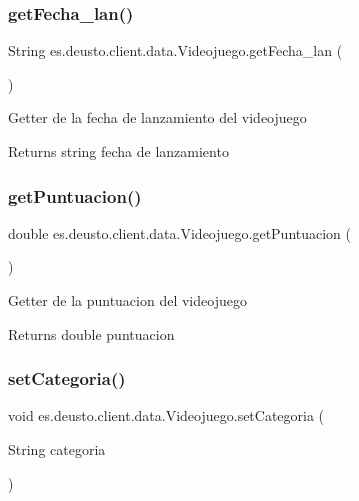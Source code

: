\subsubsection{\texorpdfstring{getFecha\_lan()}{getFecha\_lan()}}
{\footnotesize\ttfamily String es.\+deusto.\+client.\+data.\+Videojuego.\+get\+Fecha\+\_\+lan (\begin{DoxyParamCaption}{ }\end{DoxyParamCaption})}

Getter de la fecha de lanzamiento del videojuego \begin{DoxyReturn}{Returns}
string fecha de lanzamiento 
\end{DoxyReturn}
\mbox{\label{classes_1_1deusto_1_1client_1_1data_1_1_videojuego_ad6beb0918c8986f14a545c2902db6c52}} 
\subsubsection{\texorpdfstring{getPuntuacion()}{getPuntuacion()}}
{\footnotesize\ttfamily double es.\+deusto.\+client.\+data.\+Videojuego.\+get\+Puntuacion (\begin{DoxyParamCaption}{ }\end{DoxyParamCaption})}

Getter de la puntuacion del videojuego \begin{DoxyReturn}{Returns}
double puntuacion 
\end{DoxyReturn}
\mbox{\label{classes_1_1deusto_1_1client_1_1data_1_1_videojuego_a7527cea1f103fb1e1b98dd944b74fc70}} 
\subsubsection{\texorpdfstring{setCategoria()}{setCategoria()}}
{\footnotesize\ttfamily void es.\+deusto.\+client.\+data.\+Videojuego.\+set\+Categoria (\begin{DoxyParamCaption}\item[{String}]{categoria }\end{DoxyParamCaption})}

